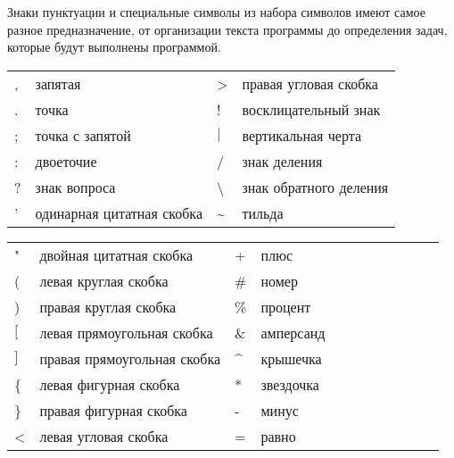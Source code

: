 Знаки пунктуации и специальные символы из набора символов имеют самое разное предназначение, от организации текста программы до определения задач, которые будут выполнены программой.

\renewcommand{\arraystretch}{1.2} %
\renewcommand{\tabcolsep}{0.2cm}   %
\begin{center}
\begin{tabular}{ l l|l l }
, &  запятая  &  >  &  правая угловая скобка   \\
. &  точка &   ! &   восклицательный знак   \\
; &  точка с запятой  &   $\vert$   &  вертикальная черта      \\
: &  двоеточие  &   /   &  знак деления   \\
? &  знак вопроса     &  \textbackslash   &  знак обратного деления    \\
' &  одинарная цитатная скобка     &  \textasciitilde  &  тильда    \\
\end{tabular}
\end{center}

\begin{center}
\begin{tabular}{ l l|l l }
" &  двойная цитатная скобка     &  +   &  плюс    \\
( & левая круглая скобка     &   \#   &  номер   \\
) &  правая круглая скобка    &   \%    &  процент \\
$ [ $ &  левая прямоугольная скобка     &  \&   &  амперсанд\\
$ ] $ &  правая прямоугольная скобка     &   \textasciicircum   &  крышечка\\
\{ &  левая фигурная скобка     &   *    &  звездочка\\
\} &  правая фигурная скобка     &   -   &  минус\\
< &  левая угловая скобка    &   =   &  равно \textcolor{white}{отступ отступ отступ} \\
\end{tabular}
\end{center}

\subsection{}

